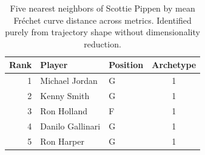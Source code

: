 \begin{table}[htbp]
  \centering\small
  \begin{tabular}{rllc}
    \toprule
    Rank & Player & Position & Archetype \\
    \midrule
    1 & Michael Jordan & G & 1 \\
    2 & Kenny Smith & G & 1 \\
    3 & Ron Holland & F & 1 \\
    4 & Danilo Gallinari & G & 1 \\
    5 & Ron Harper & G & 1 \\
    \bottomrule
  \end{tabular}
  \caption{Five nearest neighbors of Scottie Pippen by mean Fr\'{e}chet curve distance across metrics. Identified purely from trajectory shape without dimensionality reduction.}
  \label{tab:Scottie_Pippen_frechet_curve_neighbors}
\end{table}

